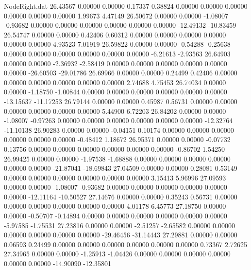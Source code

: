 \begin{filecontents}{NodeRight.dat}
  26.43567    0.00000    0.00000     0.17337    0.38824    0.00000    0.00000    0.00000    0.00000    0.00000    0.00000    1.99673    4.47149
  26.50672    0.00000    0.00000    -1.08007   -0.93682    0.00000    0.00000    0.00000    0.00000    0.00000    0.00000  -12.49132  -10.83459
  26.54747    0.00000    0.00000     0.42406    0.60312    0.00000    0.00000    0.00000    0.00000    0.00000    0.00000    4.93523    7.01919
  26.59822    0.00000    0.00000    -0.54288   -0.25638    0.00000    0.00000    0.00000    0.00000    0.00000    0.00000   -6.21613   -2.93563
  26.64903    0.00000    0.00000    -2.36932   -2.58419    0.00000    0.00000    0.00000    0.00000    0.00000    0.00000  -26.60503  -29.01786
  26.69966    0.00000    0.00000     0.24499    0.42406    0.00000    0.00000    0.00000    0.00000    0.00000    0.00000    2.74688    4.75453
  26.74034    0.00000    0.00000    -1.18750   -1.00844    0.00000    0.00000    0.00000    0.00000    0.00000    0.00000  -13.15637  -11.17253
  26.79144    0.00000    0.00000     0.45987    0.56731    0.00000    0.00000    0.00000    0.00000    0.00000    0.00000    5.44900    6.72203
  26.84202    0.00000    0.00000    -1.08007   -0.97263    0.00000    0.00000    0.00000    0.00000    0.00000    0.00000  -12.32764  -11.10138
  26.90283    0.00000    0.00000    -0.04151    0.10174    0.00000    0.00000    0.00000    0.00000    0.00000    0.00000   -0.48412    1.18672
  26.95371    0.00000    0.00000    -0.07732    0.13756    0.00000    0.00000    0.00000    0.00000    0.00000    0.00000   -0.86702    1.54250
  26.99425    0.00000    0.00000    -1.97538   -1.68888    0.00000    0.00000    0.00000    0.00000    0.00000    0.00000  -21.87041  -18.69843
  27.04509    0.00000    0.00000     0.28081    0.53149    0.00000    0.00000    0.00000    0.00000    0.00000    0.00000    3.15413    5.96996
  27.09593    0.00000    0.00000    -1.08007   -0.93682    0.00000    0.00000    0.00000    0.00000    0.00000    0.00000  -12.11164  -10.50527
  27.14676    0.00000    0.00000     0.35243    0.56731    0.00000    0.00000    0.00000    0.00000    0.00000    0.00000    4.01178    6.45773
  27.18750    0.00000    0.00000    -0.50707   -0.14894    0.00000    0.00000    0.00000    0.00000    0.00000    0.00000   -5.97585   -1.75531
  27.23816    0.00000    0.00000    -2.51257   -2.65582    0.00000    0.00000    0.00000    0.00000    0.00000    0.00000  -29.46456  -31.14443
  27.29881    0.00000    0.00000     0.06593    0.24499    0.00000    0.00000    0.00000    0.00000    0.00000    0.00000    0.73367    2.72625
  27.34965    0.00000    0.00000    -1.25913   -1.04426    0.00000    0.00000    0.00000    0.00000    0.00000    0.00000  -14.90090  -12.35801

\end{filecontents}
